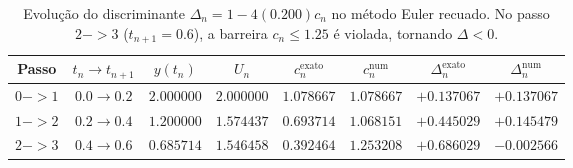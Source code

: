 \begin{table}[H]
    \centering
    \small
    \begin{tabular}{cccccccc}
        \hline
        Passo & $t_n \to t_{n+1}$ & $y(t_n)$ & $U_n$ & $c_n^{\text{exato}}$ & $c_n^{\text{num}}$ & $\Delta_n^{\text{exato}}$ & $\Delta_n^{\text{num}}$ \\
        \hline
        $0->1$ & $0.0 \to 0.2$ & $2.000000$ & $2.000000$ & $1.078667$ & $1.078667$ & $+0.137067$ & $+0.137067$ \\
        $1->2$ & $0.2 \to 0.4$ & $1.200000$ & $1.574437$ & $0.693714$ & $1.068151$ & $+0.445029$ & $+0.145479$ \\
        $2->3$ & $0.4 \to 0.6$ & $0.685714$ & $1.546458$ & $0.392464$ & $1.253208$ & $+0.686029$ & $\mathbf{-0.002566}$ \\
        \hline
    \end{tabular}
    \caption{Evolução do discriminante $\Delta_n = 1 - 4(0.200)c_n$ no método Euler recuado. No passo $2->3$ ($t_{n+1} = 0.6$), a barreira $c_n \le 1.25$ é violada, tornando $\Delta < 0$.}
    \label{tab:discriminante_euler_k02}
\end{table}
